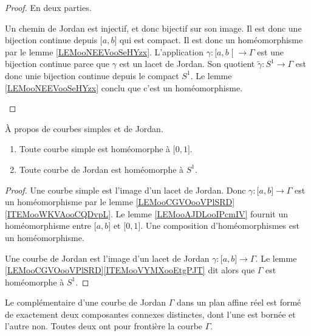 \begin{proof}
    En deux parties.
    \begin{subproof}
        Un chemin de Jordan est injectif, et donc bijectif sur son image. Il est donc une bijection continue depuis \( \mathopen[ a , b \mathclose]\) qui est compact. Il est donc un homéomorphisme par le lemme \ref{LEMooNEEVooSeHYzx}.
        L'application \( \gamma\colon \mathopen[ a , b \mathclose[\to \Gamma \) est une bijection continue parce que \( \gamma\) est un lacet de Jordan. Son quotient \( \tilde \gamma\colon S^1\to \Gamma\) est donc unie bijection continue depuis le compact \( S^1\). Le lemme \ref{LEMooNEEVooSeHYzx} conclu que c'est un homéomorphisme.
    \end{subproof}
\end{proof}

\begin{corollary}
    À propos de courbes simples et de Jordan.
    \begin{enumerate}
        \item
            Toute courbe simple est homéomorphe à \( \mathopen[ 0 , 1 \mathclose]\).
        \item
            Toute courbe de Jordan est homéomorphe à \( S^1\).
    \end{enumerate}
\end{corollary}

\begin{proof}
    Une courbe simple est l'image d'un lacet de Jordan. Donc \( \gamma\colon \mathopen[ a , b \mathclose]\to \Gamma\) est un homéomorphisme par le lemme \ref{LEMooCGVOooVPlSRD}\ref{ITEMooWKVAooCQDvpL}. Le lemme \ref{LEMooAJDLooIPcmIV} fournit un homéomorphisme entre \( \mathopen[ a , b \mathclose]\) et \( \mathopen[ 0 , 1 \mathclose]\). Une composition d'homéomorphismes est un homéomorphisme.

    Une courbe de Jordan est l'image d'un lacet de Jordan \( \gamma\colon \mathopen[ a , b \mathclose]\to \Gamma\). Le lemme \ref{LEMooCGVOooVPlSRD}\ref{ITEMooVYMXooEtgPJT} dit alors que \( \Gamma\) est homéomorphe à \( S^1\).
\end{proof}


\begin{theorem}\label{ThoHSPWBuh}
	Le complémentaire d'une courbe de Jordan \( \Gamma\) dans un plan affine réel est formé de exactement deux composantes connexes distinctes, dont l'une est bornée et l'autre non. Toutes deux ont pour frontière la courbe \( \Gamma\).
\end{theorem}
